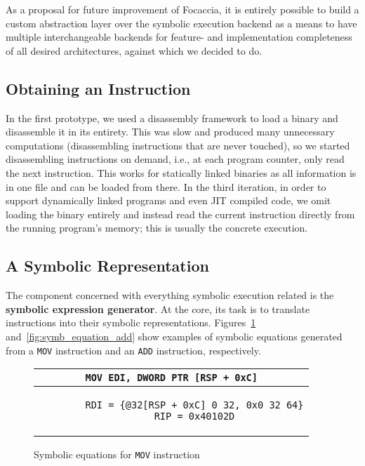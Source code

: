 As a proposal for future improvement of Focaccia, it is entirely possible to build a custom abstraction layer over the
symbolic execution backend as a means to have multiple interchangeable backends for feature- and implementation
completeness of all desired architectures, against which we decided to do.

\subsection{Obtaining an Instruction}

In the first prototype, we used a disassembly framework to load a binary and disassemble it in its entirety. This was
slow and produced many unnecessary computations (disassembling instructions that are never touched), so we started
disassembling instructions on demand, i.e., at each program counter, only read the next instruction. This works for
statically linked binaries as all information is in one file and can be loaded from there. In the third iteration, in
order to support dynamically linked programs and even \ac{JIT} compiled code, we omit loading the binary entirely and
instead read the current instruction directly from the running program's memory; this is usually the concrete execution.

\subsection{A Symbolic Representation}

The component concerned with everything symbolic execution related is the \textbf{symbolic expression generator}. At the
core, its task is to translate instructions into their symbolic representations. Figures~\ref{fig:symb_equation_mov}
and~\ref{fig:symb_equation_add} show examples of symbolic equations generated from a \texttt{MOV} instruction and an
\texttt{ADD} instruction, respectively.

\begin{figure}[htbp]
    \centering
    \begin{tabular}{c}
    \texttt{MOV        EDI, DWORD PTR [RSP + 0xC]} \\
    \midrule
    \begin{lstlisting}
        RDI = {@32[RSP + 0xC] 0 32, 0x0 32 64}
        RIP = 0x40102D
    \end{lstlisting}
    \end{tabular}
    \caption{Symbolic equations for \texttt{MOV} instruction}\label{fig:symb_equation_mov}
\end{figure}

